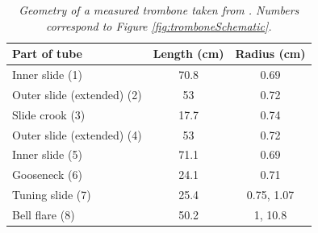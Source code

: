 \begin{table}[t]
    \small
    \begin{center}
    \caption{\it Geometry of a measured trombone taken from \cite{Smyth2011}. Numbers correspond to Figure \ref{fig:tromboneSchematic}.\label{tab:geometry}}
    \begin{tabular}{|l|c|c|}
        \hline
        Part of tube & Length (cm) & Radius (cm)\\\hline
        Inner slide (1) & 70.8 & 0.69\\
        Outer slide (extended) (2) & 53 & 0.72 
        \\
        Slide crook (3)& 17.7 & 0.74\\
        Outer slide (extended) (4) & 53 & 0.72 
        \\
        Inner slide (5) & 71.1 & 0.69\\
        Gooseneck (6) & 24.1 & 0.71\\
        Tuning slide (7) & 25.4 & 0.75, 1.07\\
        Bell flare (8) & 50.2& 1, 10.8\\\hline
    \end{tabular}
    \end{center}
\end{table}


